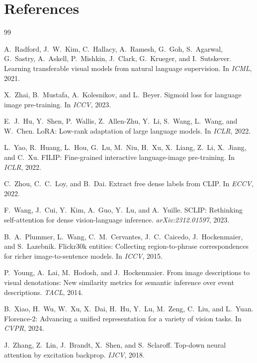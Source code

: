 \documentclass{article}
\begin{document}
\section*{References}
\begingroup
\renewcommand{\section}[2]{}
\begin{thebibliography}{99}

A.\ Radford, J.\ W.\ Kim, C.\ Hallacy, A.\ Ramesh, G.\ Goh, S.\ Agarwal,
G.\ Sastry, A.\ Askell, P.\ Mishkin, J.\ Clark, G.\ Krueger, and I.\ Sutskever.
Learning transferable visual models from natural language supervision.
In \emph{ICML}, 2021.

X.\ Zhai, B.\ Mustafa, A.\ Kolesnikov, and L.\ Beyer.
Sigmoid loss for language image pre-training.
In \emph{ICCV}, 2023.

E.\ J.\ Hu, Y.\ Shen, P.\ Wallis, Z.\ Allen-Zhu, Y.\ Li, S.\ Wang, L.\ Wang,
and W.\ Chen.
LoRA: Low-rank adaptation of large language models.
In \emph{ICLR}, 2022.

L.\ Yao, R.\ Huang, L.\ Hou, G.\ Lu, M.\ Niu, H.\ Xu, X.\ Liang, Z.\ Li,
X.\ Jiang, and C.\ Xu.
FILIP: Fine-grained interactive language-image pre-training.
In \emph{ICLR}, 2022.

C.\ Zhou, C.\ C.\ Loy, and B.\ Dai.
Extract free dense labels from CLIP.
In \emph{ECCV}, 2022.

F.\ Wang, J.\ Cui, Y.\ Kim, A.\ Guo, Y.\ Lu, and A.\ Yuille.
SCLIP: Rethinking self-attention for dense vision-language inference.
\emph{arXiv:2312.01597}, 2023.

B.\ A.\ Plummer, L.\ Wang, C.\ M.\ Cervantes, J.\ C.\ Caicedo,
J.\ Hockenmaier, and S.\ Lazebnik.
Flickr30k entities: Collecting region-to-phrase correspondences for richer
image-to-sentence models.
In \emph{ICCV}, 2015.

P.\ Young, A.\ Lai, M.\ Hodosh, and J.\ Hockenmaier.
From image descriptions to visual denotations: New similarity metrics for
semantic inference over event descriptions.
\emph{TACL}, 2014.

B.\ Xiao, H.\ Wu, W.\ Xu, X.\ Dai, H.\ Hu, Y.\ Lu, M.\ Zeng, C.\ Liu, and
L.\ Yuan.
Florence-2: Advancing a unified representation for a variety of vision tasks.
In \emph{CVPR}, 2024.

J.\ Zhang, Z.\ Lin, J.\ Brandt, X.\ Shen, and S.\ Sclaroff.
Top-down neural attention by excitation backprop.
\emph{IJCV}, 2018.

\end{thebibliography}
\endgroup
\end{document}
